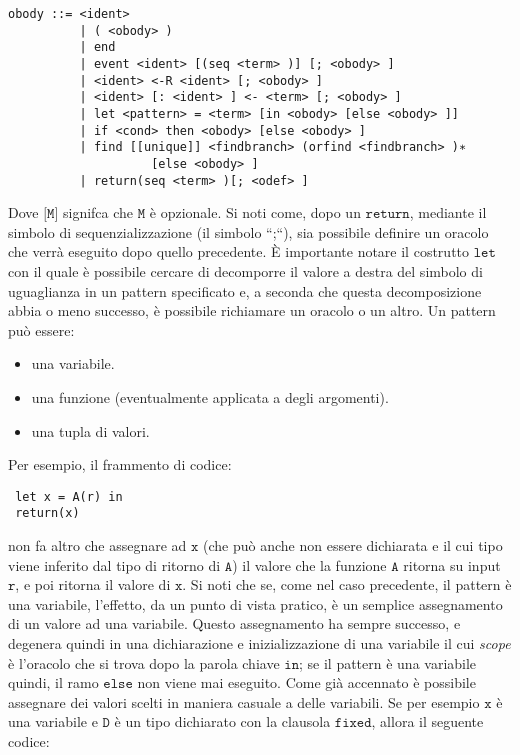 \documentclass[a4paper,openright,twoside,12pt]{report}
\begin{document}
\begin{verbatim}
obody ::= <ident>
          | ( <obody> )
          | end
          | event <ident> [(seq <term> )] [; <obody> ]
          | <ident> <-R <ident> [; <obody> ]
          | <ident> [: <ident> ] <- <term> [; <obody> ]
          | let <pattern> = <term> [in <obody> [else <obody> ]]
          | if <cond> then <obody> [else <obody> ]
          | find [[unique]] <findbranch> (orfind <findbranch> )∗ 
                    [else <obody> ]
          | return(seq <term> )[; <odef> ]
\end{verbatim}
Dove $\texttt{[M]}$ signifca che $\texttt{M}$ \`e opzionale.
Si noti come, dopo un $\texttt{return}$, mediante il simbolo di sequenzializzazione (il simbolo ``;``), sia possibile definire un oracolo che verr\`a eseguito dopo quello precedente.
\`E importante notare il costrutto $\texttt{let}$ con il quale \`e possibile cercare di decomporre il valore a destra del simbolo di uguaglianza in un pattern specificato e, 
a seconda che questa decomposizione abbia o meno successo, \`e possibile richiamare un oracolo o un altro. 
Un pattern pu\`o essere:
\begin{itemize}
 \item una variabile.
 \item una funzione (eventualmente applicata a degli argomenti).
 \item una tupla di valori. 
\end{itemize}
Per esempio, il frammento di codice:
\begin{verbatim}
 let x = A(r) in
 return(x) 
\end{verbatim}
non fa altro che assegnare ad $\texttt{x}$ (che pu\`o anche non essere dichiarata e il cui tipo viene inferito dal tipo di ritorno di $\texttt{A}$) il valore che la funzione $\texttt{A}$ ritorna su input $\texttt{r}$, e poi ritorna il valore di $\texttt{x}$.
Si noti che se, come nel caso precedente, il pattern \`e una variabile, l'effetto, da un punto di vista pratico, \`e un semplice assegnamento di un valore ad una variabile.
Questo assegnamento ha sempre successo, e degenera quindi in una dichiarazione e inizializzazione di una variabile il cui \emph{scope} \`e l'oracolo che si trova dopo la parola chiave $\texttt{in}$; 
se il pattern \`e una variabile quindi, il ramo $\texttt{else}$ non viene mai eseguito.
Come gi\`a accennato \`e possibile assegnare dei valori scelti in maniera casuale a delle variabili. Se per esempio $\texttt{x}$ \`e una variabile e $\texttt{D}$ \`e un tipo dichiarato
con la clausola $\texttt{fixed}$, allora il seguente codice:
\end{document}
